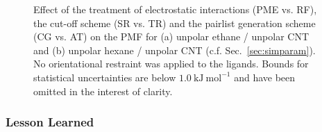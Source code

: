 \documentclass[9pt,lessons]{livecoms}
\begin{document}
\begin{figure}[htb!]
  \centering    
  \caption{Effect of the treatment of electrostatic interactions (PME vs. RF), the cut-off scheme (SR vs. TR) and the pairlist generation scheme (CG vs. AT) on the PMF for (a) unpolar ethane / unpolar CNT 
  and (b) unpolar hexane / unpolar CNT (c.f. Sec.~\ref{sec:simparam}). 
  No orientational restraint was applied to the ligands. 
  Bounds for statistical uncertainties are below $1.0~\mathrm{kJ}~\mathrm{mol}^{-1}$ and have been omitted in the interest of clarity.
}  
\label{fig:UU_MultiLig_CNT_electrst}
\end{figure}


\subsubsection*{Lesson Learned}
\end{document}
